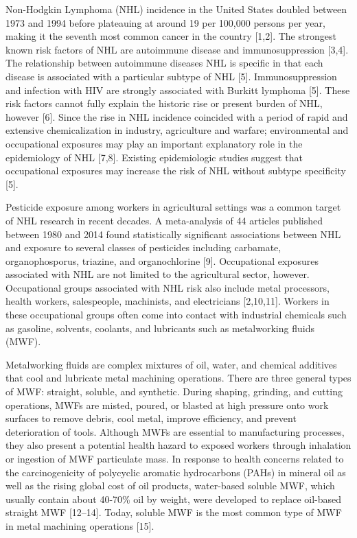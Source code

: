 \documentclass[
  11pt,
  letterpaper,
  DIV=11,
  numbers=noendperiod]{scrartcl}
\begin{document}
Non-Hodgkin Lymphoma (NHL) incidence in the United States doubled
between 1973 and 1994 before plateauing at around 19 per 100,000 persons
per year, making it the seventh most common cancer in the country
{[}1,2{]}. The strongest known risk factors of NHL are autoimmune
disease and immunosuppression {[}3,4{]}. The relationship between
autoimmune diseases NHL is specific in that each disease is associated
with a particular subtype of NHL {[}5{]}. Immunosuppression and
infection with HIV are strongly associated with Burkitt lymphoma
{[}5{]}. These risk factors cannot fully explain the historic rise or
present burden of NHL, however {[}6{]}. Since the rise in NHL incidence
coincided with a period of rapid and extensive chemicalization in
industry, agriculture and warfare; environmental and occupational
exposures may play an important explanatory role in the epidemiology of
NHL {[}7,8{]}. Existing epidemiologic studies suggest that occupational
exposures may increase the risk of NHL without subtype specificity
{[}5{]}.

Pesticide exposure among workers in agricultural settings was a common
target of NHL research in recent decades. A meta-analysis of 44 articles
published between 1980 and 2014 found statistically significant
associations between NHL and exposure to several classes of pesticides
including carbamate, organophosporus, triazine, and organochlorine
{[}9{]}. Occupational exposures associated with NHL are not limited to
the agricultural sector, however. Occupational groups associated with
NHL risk also include metal processors, health workers, salespeople,
machinists, and electricians {[}2,10,11{]}. Workers in these
occupational groups often come into contact with industrial chemicals
such as gasoline, solvents, coolants, and lubricants such as
metalworking fluids (MWF).

Metalworking fluids are complex mixtures of oil, water, and chemical
additives that cool and lubricate metal machining operations. There are
three general types of MWF: straight, soluble, and synthetic. During
shaping, grinding, and cutting operations, MWFs are misted, poured, or
blasted at high pressure onto work surfaces to remove debris, cool
metal, improve efficiency, and prevent deterioration of tools. Although
MWFs are essential to manufacturing processes, they also present a
potential health hazard to exposed workers through inhalation or
ingestion of MWF particulate mass. In response to health concerns
related to the carcinogenicity of polycyclic aromatic hydrocarbons
(PAHs) in mineral oil as well as the rising global cost of oil products,
water-based soluble MWF, which usually contain about 40-70\% oil by
weight, were developed to replace oil-based straight MWF {[}12--14{]}.
Today, soluble MWF is the most common type of MWF in metal machining
operations {[}15{]}.
\end{document}
